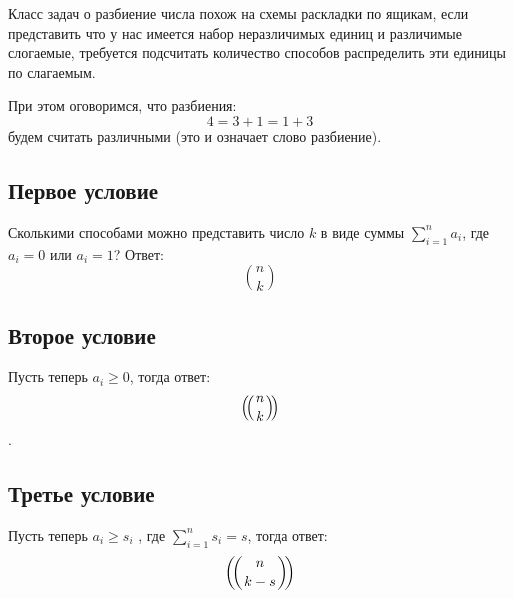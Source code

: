 Класс задач о разбиение числа похож на схемы раскладки по ящикам, если представить что у нас имеется набор неразличимых единиц и различимые слогаемые, требуется подсчитать количество способов распределить эти единицы по слагаемым.

При этом оговоримся, что разбиения:
\[
	4 = 3 + 1 = 1 + 3
\]
будем считать различными (это и означает слово разбиение).

\subsection{Первое условие}

Сколькими способами можно представить число $k$ в виде суммы $\sum_{i=1}^n a_i$, где $a_i = 0$ или $a_i = 1$? Ответ: $$ \binom{n}{k} $$

\subsection{Второе условие}

Пусть теперь $a_i \ge 0$, тогда ответ: $$ \left(\negmedspace\left({{n}\atop{k}}\right)\negmedspace\right) $$.

\subsection{Третье условие}

Пусть теперь $a_i \ge s_i$ , где $\sum_{i=1}^n s_i = s$, тогда ответ: $$ \left(\negmedspace\left({{n}\atop{k-s}}\right)\negmedspace\right)$$

